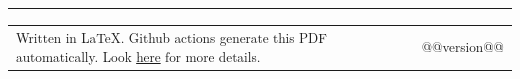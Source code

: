 \documentclass[10pt,a4paper]{article}
\makeatletter
\newcommand{\headerrow}[2]
{\begin{tabular*}{\linewidth}{l@{\extracolsep{\fill}}r}
	#1 &
	#2 \\
\end{tabular*}}
\makeatother
\begin{document}
\hrule
\vspace{-0.4em}

\begin{description*}
  	\item
  \headerrow
    {{\textsubscript{Written in \LaTeX. Github actions generate this PDF automatically. Look \href{https://github.com/robert-will-brown/cv}{here} for more details.}}}
    {{\textsubscript{@@version@@}}}

\end{description*}
\end{document}
